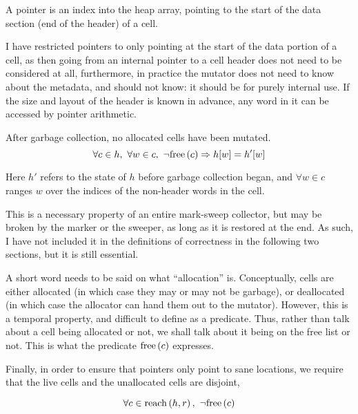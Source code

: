 \begin{definition}[Pointer]
  \label{def:ms-pointer}
  A pointer is an index into the heap array, pointing to the start of
  the data section (end of the header) of a cell.
\end{definition}

I have restricted pointers to only pointing at the start of the data
portion of a cell, as then going from an internal pointer to a cell
header does not need to be considered at all, furthermore, in practice
the mutator does not need to know about the metadata, and should not
know: it should be for purely internal use. If the size and layout of
the header is known in advance, any word in it can be accessed by
pointer arithmetic.

\begin{definition}
  \label{def:ms-word-preservation}
  After garbage collection, no allocated cells have been mutated.
   \[\forall c \in h,\ \forall w \in c,\ \lnot\mathrm{free}\left(c\right) \Rightarrow h[w] =
   h'[w]\]

   Here $h'$ refers to the state of $h$ before garbage collection
   began, and $\forall w \in c$ ranges $w$ over the indices of the
   non-header words in the cell.
\end{definition}

This is a necessary property of an entire mark-sweep collector, but
may be broken by the marker or the sweeper, as long as it is restored
at the end. As such, I have not included it in the definitions of
correctness in the following two sections, but it is still essential.

A short word needs to be said on what ``allocation'' is. Conceptually,
cells are either allocated (in which case they may or may not be
garbage), or deallocated (in which case the allocator can hand them
out to the mutator). However, this is a temporal property, and
difficult to define as a predicate. Thus, rather than talk about a
cell being allocated or not, we shall talk about it being on the free
list or not. This is what the predicate $\mathrm{free}\left(c\right)$ expresses.

Finally, in order to ensure that pointers only point to sane
locations, we require that the live cells and the unallocated cells
are disjoint,

\begin{definition}
  \label{def:ms-live-cell-invariant}
  \[\forall c \in \reach{h}{r},\ \lnot\free{c}\]
\end{definition}

